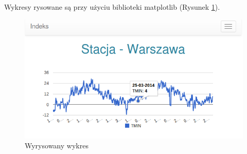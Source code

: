 Wykresy rysowane są przy użyciu biblioteki matplotlib (Rysunek \ref{fig:wykres}). 
\newline
\begin{figure}[p]
	\centering
	\includegraphics[width=\linewidth]{002}
	\caption{Wyrysowany wykres}
	\label{fig:wykres}
	\end{figure}
